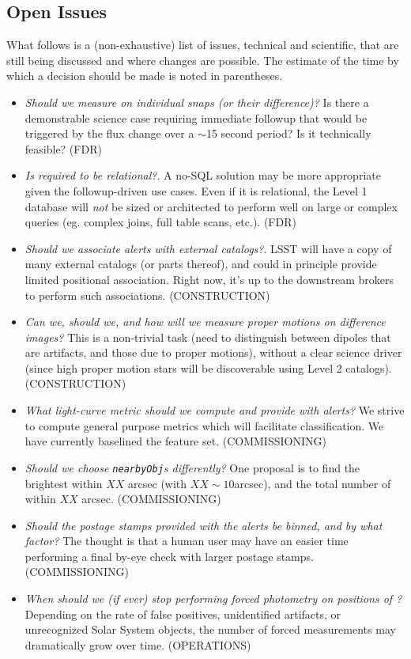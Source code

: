 \documentclass[SE,lsstdraft,toc]{lsstdoc}
\begin{document}
\begin{openissues}
\subsection{Open Issues}

What follows is a (non-exhaustive) list of issues, technical and scientific, that are still being discussed and where changes are possible. The estimate of the time by which a decision should be made is noted in parentheses.

\begin{itemize}
    \item \emph{Should we measure on individual snaps (or their difference)?} Is there a demonstrable science case requiring immediate followup that would be triggered by the flux change over a $\sim$15 second period? Is it technically feasible? (FDR)
    \item \emph{Is \DB required to be relational?}. A no-SQL solution may be more appropriate given the followup-driven use cases. Even if it is relational, the Level 1 database will \emph{not} be sized or architected to perform well on large or complex queries (eg. complex joins, full table scans, etc.). (FDR)
    \item \emph{Should we associate alerts with external catalogs?}. LSST will have a copy of many external catalogs (or parts thereof), and could in principle provide limited positional association. Right now, it's up to the downstream brokers to perform such associations. (CONSTRUCTION)
    \item \emph{Can we, should we, and how will we measure proper motions on difference images?} This is a non-trivial task (need to distinguish between dipoles that are artifacts, and those due to proper motions), without a clear science driver (since high proper motion stars will be discoverable using Level 2 catalogs). (CONSTRUCTION)
    \item \emph{What light-curve metric should we compute and provide with alerts?} We strive to compute general purpose metrics which will facilitate classification. We have currently baselined the \citet{2011ApJ...733...10R} feature set. (COMMISSIONING)
    \item \emph{Should we choose \texttt{nearbyObj}s differently?} One proposal is to find the brightest \Object within $XX$ arcsec (with $XX \sim 10$arcsec), and the total number of \Objects within $XX$ arcsec. (COMMISSIONING)
    \item \emph{Should the postage stamps provided with the alerts be binned, and by what factor?} The thought is that a human user may have an easier time performing a final by-eye check with larger postage stamps. (COMMISSIONING)
    \item \emph{When should we (if ever) stop performing forced photometry on positions of \DIAObjects?} Depending on the rate of false positives, unidentified artifacts, or unrecognized Solar System objects, the number of forced measurements may dramatically grow over time. (OPERATIONS)

\end{itemize}
\end{openissues}
\end{document}

